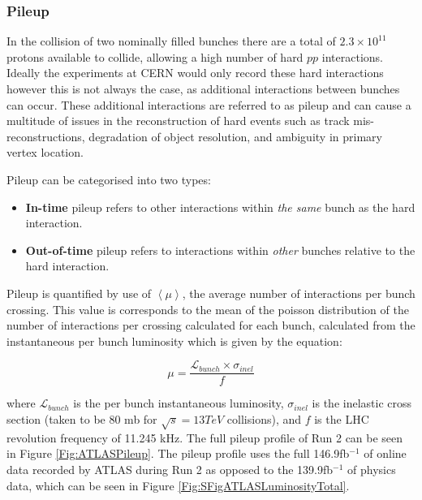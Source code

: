 \documentclass[12pt,a4paper,epsf,portrait,times,epsfig]{article}
\begin{document}

		\subsubsection{Pileup}\label{Section:Pileup}

		In the collision of two nominally filled bunches there are a total of $2.3 \times 10^{11}$ protons available to collide, allowing a high number of hard $pp$ interactions. Ideally the experiments at CERN would only record these hard interactions however this is not always the case, as additional interactions between bunches can occur. These additional interactions are referred to as pileup and can cause a multitude of issues in the reconstruction of hard events such as track mis-reconstructions, degradation of object resolution, and ambiguity in primary vertex location. \par
		
		Pileup can be categorised into two types:

		\begin{itemize}
			\item \textbf{In-time} pileup refers to other interactions within \textit{the same} bunch as the hard interaction.
			\item \textbf{Out-of-time} pileup refers to interactions within \textit{other} bunches relative to the hard interaction.   
		\end{itemize}

		Pileup is quantified by use of $\left\langle \mu \right\rangle$, the average number of interactions per bunch crossing. This value is corresponds to the mean of the poisson distribution of the number of interactions per crossing calculated for each bunch, calculated from the instantaneous per bunch luminosity which is given by the equation:

		\begin{equation}
			\mu = \frac{\mathcal{L}_{bunch}\times\sigma_{inel}}{f}
		\end{equation}

		where $\mathcal{L}_{bunch}$ is the per bunch instantaneous luminosity, $\sigma_{inel}$ is the inelastic cross section (taken to be 80 mb for $\sqrt{s}=13 TeV$ collisions), and $f$ is the LHC revolution frequency of 11.245 kHz. The full pileup profile of Run 2
		can be seen in Figure \ref{Fig:ATLASPileup}. The pileup profile uses the full 146.9fb$^{-1}$ of online data recorded by ATLAS during Run 2 as opposed to the 139.9fb$^{-1}$ of physics data, which can be seen in Figure \ref{Fig:SFigATLASLuminosityTotal}. 
\end{document}
